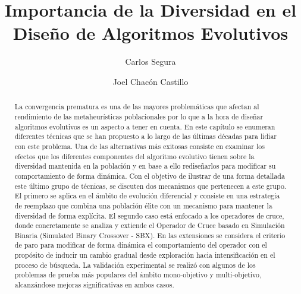 \documentclass[3p]{elsarticle}
\begin{document}
\begin{frontmatter}

\title{Importancia de la Diversidad en el Diseño de Algoritmos Evolutivos}

\author[label1]{Carlos Segura}

\author[label1]{Joel Chac\'on Castillo}


\address[label1]{Área de Ciencias de Computación, Centro de Investigación de Matemáticas (CIMAT), Callej\'on Jalisco s/n, Mineral de Valenciana, Guanajuato, Guanajuato 36240, México}

\begin{abstract}
La convergencia prematura es una de las mayores problemáticas que afectan al rendimiento de las metaheurísticas poblacionales por lo que
a la hora de diseñar algoritmos evolutivos es un aspecto a tener en cuenta.
%
En este capítulo se enumeran diferentes técnicas que se han propuesto a lo largo de las últimas décadas para lidiar con este problema.
%
Una de las alternativas más exitosas consiste en examinar los efectos que los diferentes componentes del algoritmo evolutivo
tienen sobre la diversidad mantenida en la población y en base a ello rediseñarlos para modificar su comportamiento de forma dinámica.
%
Con el objetivo de ilustrar de una forma detallada este último grupo de técnicas, se discuten dos mecanismos que pertenecen a este grupo.
%
El primero se aplica en el ámbito de evolución diferencial y consiste en una estrategia de reemplazo que combina una población élite con un mecanismo para mantener 
la diversidad de forma explícita.
%
%
%
El segundo caso está enfocado a los operadores de cruce, donde concretamente se analiza y extiende el Operador de Cruce basado en Simulación 
Binaria (Simulated Binary Crossover - SBX).
%
En las extensiones se considera el criterio de paro para modificar de forma dinámica el comportamiento del operador con el propósito de inducir un cambio gradual 
desde exploración hacia intensificación en el proceso de búsqueda.
%
La validación experimental se realizó con algunos de los problemas de prueba más populares del ámbito mono-objetivo y multi-objetivo,
alcanzándose mejoras significativas en ambos casos.
%
\end{abstract}


\end{frontmatter}
\end{document}
